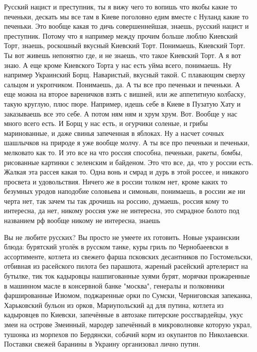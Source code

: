 Русский нацист и преступник, ты я вижу чего то вопишь что якобы какие то
печеньки, дескать мы все там в Киеве поголовно едим вместе с Нуланд какие то
печеньки. Это вообще какая то дичь совершеннейшая, знаешь, русский нацист и
преступник. Потому что я например между прочим больше люблю Киевский Торт,
знаешь, роскошный вкусный Киевский Торт. Понимаешь, Киевский Торт. Ты вот
живешь непонятно где, и не знаешь, что такое Киевский Торт. А я вот знаю. А еще
кроме Киевского Торта у нас есть уйма всего, понимаешь. Ну например Украинский
Борщ. Наваристый, вкусный такой. С плавающим сверху сальцом и укропчиком.
Понимаешь, да. А ты все про печеньки и печеньки. А еще можна на второе
вареничков взять с вишней, или же аппетитную колбаску, такую круглую, плюс
пюре. Например, идешь себе в Киеве в Пузатую Хату и заказываешь все это себе. А
потом ням ням и хрум хрум. Вот.  Вообще у нас много всего есть. И Борщ у нас
есть, и огурчики соленые, и грибы маринованные, и даже свинья запеченная в
яблоках. Ну а насчет сочных шашлычков на природе я уже вообще молчу. А ты все
про печеньки и печеньки, мелковато как то. И это все на что россия способна,
печеньки, ракеты, бомбы, рисованные картинки с зеленским и байденом. Это что
все, да, что у россии есть. Жалкая эта рассея какая то. Одна вонь и смрад и
дурь в этой россее, и никакого просвета и удовольствия. Ничего же в россии
толком нет, кроме каких то безумных уродов наподобие соловьева и симоньян,
понимаешь, в россии же ни черта нет, так зачем ты так дрочишь на россию,
думаешь, россия кому то интересна, да нет, никому россия уже не интересна, это
смрадное болото под названием рф вообще никому не интересна, знаешь

Вы не любите русских? Вы просто не умеете их готовить. Новые украинскии блюда:
бурятский уголёк в русском танке, куры гриль по Чернобаеевски в ассортименте,
котлета из свежего фарша псковских десантников по Гостомельски, отбивная из
расейского пилота без парашюта, жареный расейский артелерист на бутылке, тик
ток кадыровцы нашпигованные хуями бурят, морячки прожаренные в машинном масле в
консервной банке "москва", генералы и полковники фаршированные Изюмом,
поджаренные орки по Сумски, Черниговская запеканка, Харьковский бульон из
орков, Мариупольский ад для путина, котлета из кадыровцев по Киевски,
запечённые в автозаке питерские россгвардейцы, укус змеи на острове Змеинный,
мародер запечённый в микроволновке которую украл, тушонка из морпехов по
Бердянски, собачий корм из окупантов по Николаевски. Поставки свежей баранины в
Украину организовал лично путин.

